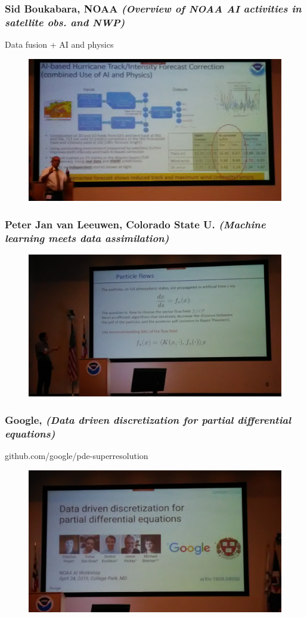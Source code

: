 \documentclass{beamer}
\begin{document}
\begin{frame}
\frametitle{Sid Boukabara, NOAA \textit{(Overview of NOAA AI activities in satellite obs. and NWP)}}
Data fusion + AI and physics
\begin{figure}
	\includegraphics[width=.9\linewidth]{figs/P_20190423_111340.jpg}
\end{figure}
\end{frame}


\begin{frame}
\frametitle{Peter Jan van Leeuwen, Colorado State U. \textit{(Machine learning meets data assimilation)}}
\begin{figure}
	\includegraphics[width=.9\linewidth]{figs/P_20190424_142507.jpg}
\end{figure}
\end{frame}

\begin{frame}
\frametitle{Google, \textit{(Data driven discretization for partial differential equations)}}
github.com/google/pde-superresolution
\begin{figure}
	\includegraphics[width=.9\linewidth]{figs/P_20190424_153531.jpg}
\end{figure}
\end{frame}
\end{document}
